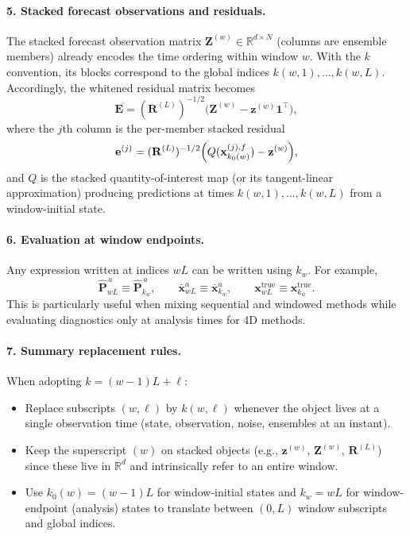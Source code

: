 \documentclass[11pt]{article}
\begin{document}
\paragraph{5. Stacked forecast observations and residuals.}
The stacked forecast observation matrix $\mathbf{Z}^{(w)}\in\mathbb{R}^{d\times N}$ (columns are ensemble members) already encodes the time ordering within window $w$. With the $k$ convention, its blocks correspond to the global indices $k(w,1),\ldots,k(w,L)$. Accordingly, the whitened residual matrix becomes
\begin{equation}
\mathbf{E}
=(\mathbf{R}^{(L)})^{-1/2}\bigl(\mathbf{Z}^{(w)}-\mathbf{z}^{(w)}\mathbf{1}^\top\bigr),
\label{eq:E_k_interpretation}
\end{equation}
where the $j$th column is the per-member stacked residual
\[
\mathbf{e}^{(j)}=(\mathbf{R}^{(L)})^{-1/2}\Bigl(Q(\mathbf{x}^{(j),f}_{k_0(w)})-\mathbf{z}^{(w)}\Bigr),
\]
and $Q$ is the stacked quantity-of-interest map (or its tangent-linear approximation) producing predictions at times $k(w,1),\ldots,k(w,L)$ from a window-initial state.

\paragraph{6. Evaluation at window endpoints.}
Any expression written at indices $wL$ can be written using $k_w$. For example,
\[
\widehat{\mathbf{P}}_{wL}^{\,a}\equiv \widehat{\mathbf{P}}_{k_w}^{\,a},
\qquad
\bar{\mathbf{x}}_{wL}^{a}\equiv \bar{\mathbf{x}}_{k_w}^{a},
\qquad
\mathbf{x}_{wL}^{\mathrm{true}}\equiv \mathbf{x}_{k_w}^{\mathrm{true}}.
\]
This is particularly useful when mixing sequential and windowed methods while evaluating diagnostics only at analysis times for 4D methods.

\paragraph{7. Summary replacement rules.}
When adopting $k=(w-1)L+\ell$:
\begin{itemize}
\item Replace subscripts $(w,\ell)$ by $k(w,\ell)$ whenever the object lives at a single observation time (state, observation, noise, ensembles at an instant).
\item Keep the superscript $(w)$ on stacked objects (e.g., $\mathbf{z}^{(w)}$, $\mathbf{Z}^{(w)}$, $\mathbf{R}^{(L)}$) since these live in $\mathbb{R}^{d}$ and intrinsically refer to an entire window.
\item Use $k_0(w)=(w-1)L$ for window-initial states and $k_w=wL$ for window-endpoint (analysis) states to translate between $(0,L)$ window subscripts and global indices.
\end{itemize}
\end{document}
